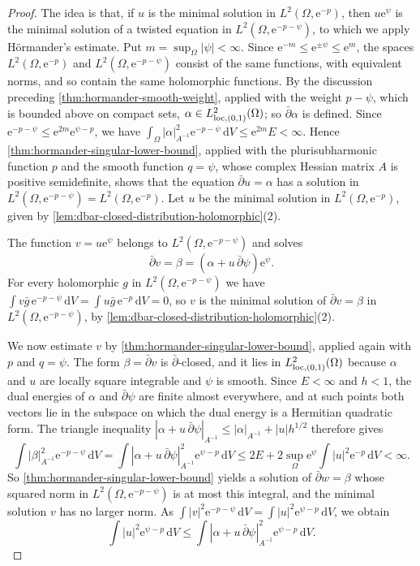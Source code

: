 \begin{proof}
The idea is that, if $u$ is the minimal solution in $L^2(\Omega,\mathrm e^{-p})$, then $u\mathrm e^\psi$ is the minimal solution of a twisted equation in $L^2(\Omega,\mathrm e^{-p-\psi})$, to which we apply H\"ormander's estimate. Put $m=\sup_\Omega|\psi|<\infty$. Since $\mathrm e^{-m}\le\mathrm e^{\pm\psi}\le\mathrm e^m$, the spaces $L^2(\Omega,\mathrm e^{-p})$ and $L^2(\Omega,\mathrm e^{-p-\psi})$ consist of the same functions, with equivalent norms, and so contain the same holomorphic functions. By the discussion preceding \cref{thm:hormander-smooth-weight}, applied with the weight $p-\psi$, which is bounded above on compact sets, $\alpha\in L^2_{\mathrm{loc},(0,1)}(\Omega)$; so $\bar\partial\alpha$ is defined. Since $\mathrm e^{-p-\psi}\le\mathrm e^{2m}\mathrm e^{\psi-p}$, we have $\int_\Omega|\alpha|_{A^{-1}}^2\mathrm e^{-p-\psi}\,\mathrm dV\le\mathrm e^{2m}E<\infty$. Hence \cref{thm:hormander-singular-lower-bound}, applied with the plurisubharmonic function $p$ and the smooth function $q=\psi$, whose complex Hessian matrix $A$ is positive semidefinite, shows that the equation $\bar\partial u=\alpha$ has a solution in $L^2(\Omega,\mathrm e^{-p-\psi})=L^2(\Omega,\mathrm e^{-p})$. Let $u$ be the minimal solution in $L^2(\Omega,\mathrm e^{-p})$, given by \cref{lem:dbar-closed-distribution-holomorphic}(2).

The function $v=u\mathrm e^\psi$ belongs to $L^2(\Omega,\mathrm e^{-p-\psi})$ and solves
\[
 \bar\partial v=\beta=(\alpha+u\,\bar\partial\psi)\mathrm e^\psi.
\]
For every holomorphic $g$ in $L^2(\Omega,\mathrm e^{-p-\psi})$ we have $\int v\bar g\,\mathrm e^{-p-\psi}\,\mathrm dV=\int u\bar g\,\mathrm e^{-p}\,\mathrm dV=0$, so $v$ is the minimal solution of $\bar\partial v=\beta$ in $L^2(\Omega,\mathrm e^{-p-\psi})$, by \cref{lem:dbar-closed-distribution-holomorphic}(2).

We now estimate $v$ by \cref{thm:hormander-singular-lower-bound}, applied again with $p$ and $q=\psi$. The form $\beta=\bar\partial v$ is $\bar\partial$-closed, and it lies in $L^2_{\mathrm{loc},(0,1)}(\Omega)$ because $\alpha$ and $u$ are locally square integrable and $\psi$ is smooth. Since $E<\infty$ and $h<1$, the dual energies of $\alpha$ and $\bar\partial\psi$ are finite almost everywhere, and at such points both vectors lie in the subspace on which the dual energy is a Hermitian quadratic form. The triangle inequality $|\alpha+u\,\bar\partial\psi|_{A^{-1}}\le|\alpha|_{A^{-1}}+|u|h^{1/2}$ therefore gives
\[
 \int|\beta|_{A^{-1}}^2\mathrm e^{-p-\psi}\,\mathrm dV=\int|\alpha+u\,\bar\partial\psi|_{A^{-1}}^2\mathrm e^{\psi-p}\,\mathrm dV\le2E+2\sup_\Omega\mathrm e^\psi\int|u|^2\mathrm e^{-p}\,\mathrm dV<\infty.
\]
So \cref{thm:hormander-singular-lower-bound} yields a solution of $\bar\partial w=\beta$ whose squared norm in $L^2(\Omega,\mathrm e^{-p-\psi})$ is at most this integral, and the minimal solution $v$ has no larger norm. As $\int|v|^2\mathrm e^{-p-\psi}\,\mathrm dV=\int|u|^2\mathrm e^{\psi-p}\,\mathrm dV$, we obtain
\[
 \int|u|^2\mathrm e^{\psi-p}\,\mathrm dV
 \le\int|\alpha+u\,\bar\partial\psi|_{A^{-1}}^2\mathrm e^{\psi-p}\,\mathrm dV.
\]


\end{proof}
